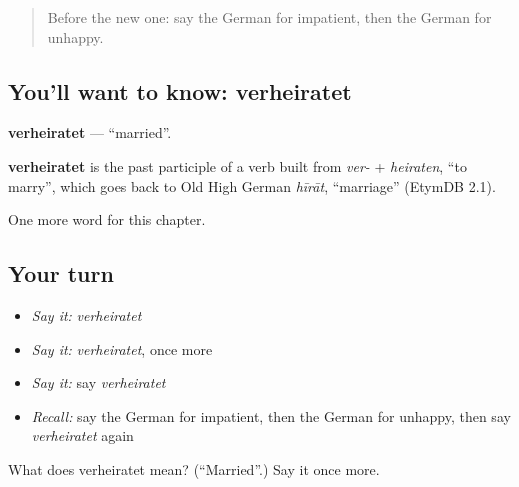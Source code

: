 \label{lesson:GE-C223-verheiratet}



\begin{quote}
Before the new one: say the German for impatient, then the German for unhappy.
\end{quote}

\subsection*{You'll want to know: verheiratet}
\textbf{verheiratet} — \textquotedblleft{}married\textquotedblright{}.

\begin{cousinweb}
\textbf{verheiratet} is the past participle of a verb built from \emph{ver-} + \emph{heiraten}, \textquotedblleft{}to marry\textquotedblright{}, which goes back to Old High German \emph{hīrāt}, \textquotedblleft{}marriage\textquotedblright{} (EtymDB 2.1).
\end{cousinweb}

\begin{grammarlens}[title={What you've built}]
One more word for this chapter.
\end{grammarlens}

\subsection*{Your turn}
\begin{itemize}
\raggedright
  \item \emph{Say it:} \emph{verheiratet}
  \item \emph{Say it:} \emph{verheiratet}, once more
  \item \emph{Say it:} say \emph{verheiratet}
  \item \emph{Recall:} say the German for impatient, then the German for unhappy, then say \emph{verheiratet} again
\end{itemize}

\begin{tcolorbox}[breakable,colback=teal!4,colframe=teal!35!black,title={Before you move on}]
What does verheiratet mean? (\textquotedblleft{}Married\textquotedblright{}.) Say it once more.
\end{tcolorbox}
